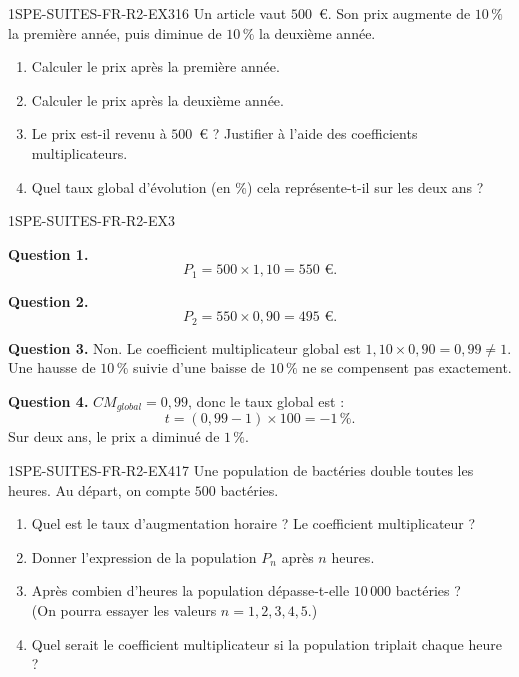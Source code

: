 
\begin{exercice}{1SPE-SUITES-FR-R2-EX3}{1}{6}
Un article vaut $500$~€. Son prix augmente de $10\,\%$ la première année, puis diminue de $10\,\%$ la deuxième année.
\begin{enumerate}
  \item Calculer le prix après la première année.
  \item Calculer le prix après la deuxième année.
  \item Le prix est-il revenu à $500$~€ ? Justifier à l'aide des coefficients multiplicateurs.
  \item Quel taux global d'évolution (en \%) cela représente-t-il sur les deux ans ?
\end{enumerate}
\end{exercice}


\begin{corrige}{1SPE-SUITES-FR-R2-EX3}

\textbf{Question 1.}
\[
P_1 = 500 \times 1{,}10 = 550 \text{ €.}
\]

\textbf{Question 2.}
\[
P_2 = 550 \times 0{,}90 = 495 \text{ €.}
\]


\textbf{Question 3.} Non. Le coefficient multiplicateur global est $1{,}10 \times 0{,}90 = 0{,}99
\neq 1$. Une hausse de $10\,\%$ suivie d'une baisse de $10\,\%$ ne se compensent pas exactement.

\textbf{Question 4.} $CM_{global} = 0{,}99$, donc le taux global est :
\[
t = (0{,}99 - 1) \times 100 = -1\,\%.
\]
Sur deux ans, le prix a diminué de $1\,\%$.

\end{corrige}


\begin{exercice}{1SPE-SUITES-FR-R2-EX4}{1}{7}
Une population de bactéries double toutes les heures. Au départ, on compte $500$ bactéries.
\begin{enumerate}
  \item Quel est le taux d'augmentation horaire ? Le coefficient multiplicateur ?
  \item Donner l'expression de la population $P_n$ après $n$ heures.
  \item Après combien d'heures la population dépasse-t-elle $10\,000$ bactéries ?\\
  (On pourra essayer les valeurs $n = 1, 2, 3, 4, 5$.)
  \item Quel serait le coefficient multiplicateur si la population triplait chaque heure ?
\end{enumerate}
\end{exercice}

